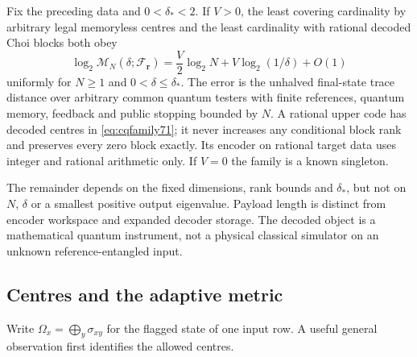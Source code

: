 \begin{theorem}\label{thm:cqentropy71}
Fix the preceding data and $0<\delta_*<2$. If $V>0$, the least covering
cardinality by arbitrary legal memoryless centres and the least
cardinality with rational decoded Choi blocks both obey
\begin{equation}\label{eq:cqentropy71}
 \log_2\mathcal M_N(\delta;\mathcal F_{\boldsymbol r})
   =\frac V2\log_2N+V\log_2(1/\delta)+O(1)
\end{equation}
uniformly for $N\ge1$ and $0<\delta\le\delta_*$. The error is the
unhalved final-state trace distance over arbitrary common quantum
testers with finite references, quantum memory, feedback and public
stopping bounded by $N$. A rational upper code has decoded centres in
\eqref{eq:cqfamily71}; it never increases any conditional block rank
and preserves every zero block exactly. Its encoder on rational target
data uses integer and rational arithmetic only. If $V=0$ the family
is a known singleton.

The remainder depends on the fixed dimensions, rank bounds and
$\delta_*$, but not on $N$, $\delta$ or a smallest positive output
eigenvalue. Payload length is distinct from encoder workspace and
expanded decoder storage. The decoded object is a mathematical
quantum instrument, not a physical classical simulator on an unknown
reference-entangled input.
\end{theorem}

\subsection{Centres and the adaptive metric}
Write $\Omega_x=\bigoplus_y\sigma_{xy}$ for the flagged state of one
input row. A useful general observation first identifies the allowed
centres.


